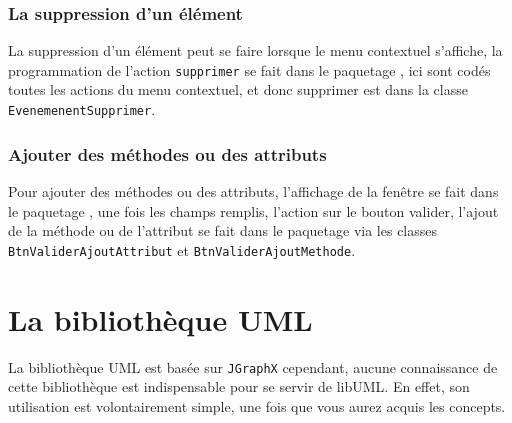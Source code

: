 \documentclass[12pt,a4paper,oneside]{book}
\begin{document}
	\subsection{La suppression d'un élément}
	La suppression d'un élément peut se faire lorsque le menu contextuel s'affiche, la programmation de l'action \texttt{supprimer} se fait dans le paquetage
	, ici sont codés toutes les actions du menu contextuel, et donc supprimer est dans la classe \texttt{EvenemenentSupprimer}.
	\subsection{Ajouter des méthodes ou des attributs}
	Pour ajouter des méthodes ou des attributs, l'affichage de la fenêtre se fait dans le paquetage , une fois les champs remplis, l'action
	sur le bouton valider, l'ajout de la méthode ou de l'attribut se fait dans le paquetage  via les classes \texttt{BtnValiderAjoutAttribut} 
	et \texttt{BtnValiderAjoutMethode}.
	
	\chapter{La bibliothèque UML}	
	\nouveauChapitre
	La bibliothèque UML est basée sur \texttt{JGraphX} cependant, aucune connaissance de cette bibliothèque est indispensable pour se servir de libUML. En effet, son 
	utilisation est volontairement simple, une fois que vous aurez acquis les concepts.
\end{document}
